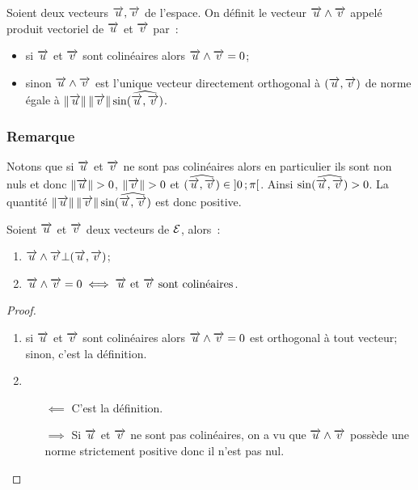 \begin{defdef}
  Soient deux vecteurs \(\vu, \vv\) de l'espace. On définit le vecteur \(\vu 
  \wedge \vv\) appelé produit vectoriel de \(\vu\) et \(\vv\) par~:
  \begin{itemize}
    \item si \(\vu\) et \(\vv\)  sont colinéaires alors \(\vu \wedge \vv = 
      0\);
    \item sinon \(\vu \wedge \vv\) est l'unique vecteur directement orthogonal 
      à \((\vu, \vv)\) de norme égale à 
      \(\norme{\vu}\norme{\vv}\sin(\widehat{\vu, \vv})\).
  \end{itemize}
\end{defdef}

\subsubsection{Remarque}

Notons que si \(\vu\) et \(\vv\) ne sont pas colinéaires alors en particulier 
ils sont non nuls et donc \(\norme{\vu}>0\), \(\norme{\vv}>0\) et 
\((\widehat{\vu, \vv})\in \intervalleoo{0}{\pi}\). Ainsi \(\sin(\widehat{\vu, 
\vv})>0\). La quantité \(\norme{\vu}\norme{\vv}\sin(\widehat{\vu, \vv})\) est 
donc positive.

\begin{prop}
  \label{prop:1}
  Soient \(\vu\) et \(\vv\) deux vecteurs de \(\E\), alors~:
  \begin{enumerate}
    \item \(\vu \wedge \vv \bot (\vu, \vv)\);
    \item \(\vu \wedge \vv = 0 \iff \vu \textrm{~et~} \vv \text{~sont 
      colinéaires}\).
  \end{enumerate}
\end{prop}

\begin{proof}
  \begin{enumerate}
    \item si \(\vu\) et \(\vv\) sont colinéaires alors \(\vu \wedge \vv = 0\) 
      est orthogonal à tout vecteur; sinon, c'est la définition.
    \item
      \begin{itemize}
        \item[\(\impliedby\)] C'est la définition.
        \item[\(\implies\)] Si \(\vu\) et \(\vv\) ne sont pas colinéaires, on 
          a vu que \(\vu \wedge \vv\) possède une norme strictement positive 
          donc il n'est pas nul.\qedhere
      \end{itemize}
  \end{enumerate}
\end{proof}

